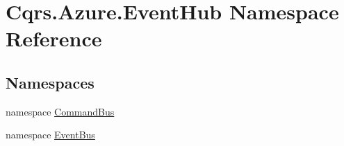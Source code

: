\hypertarget{namespaceCqrs_1_1Azure_1_1EventHub}{}\section{Cqrs.\+Azure.\+Event\+Hub Namespace Reference}
\label{namespaceCqrs_1_1Azure_1_1EventHub}
\subsection*{Namespaces}
\begin{DoxyCompactItemize}
\item 
namespace \hyperlink{namespaceCqrs_1_1Azure_1_1EventHub_1_1CommandBus}{Command\+Bus}
\item 
namespace \hyperlink{namespaceCqrs_1_1Azure_1_1EventHub_1_1EventBus}{Event\+Bus}
\end{DoxyCompactItemize}
